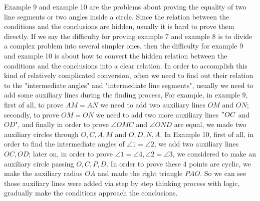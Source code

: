 \documentclass[12pt]{article}
\begin{document}
Example 9 and example 10 are the problems about proving the equality of two line segments or two angles inside a circle. Since the relation between the conditions and the conclusions are hidden,
usually it is hard to prove them directly. If we say the difficulty for proving example 7 and example 8 is to divide a complex problem into several simpler ones, then the difficulty for example 9 and
example 10 is about how to convert the hidden relation between the conditions and the conclusions into a clear relation.
In order to accomplish this kind of relatively complicated conversion, often we need to find out their relation to the "intermediate angles" and "intermediate line segments", usually we need to add some
auxiliary lines  during the finding process, 
For example, in example 9, first of all,  to prove $AM=AN$ we need to add two auxiliary lines $OM$ and $ ON$; secondly, to prove $OM=ON$ we need to add two more auxiliary lines $"OC$ and $OD$",
and finally in order to prove $\angle OMC$ and $\angle OND$ are equal, we made two auxiliary circles through $O, C, A, M$ and $O, D, N, A$.
In Example 10, first of all,  in order to find the intermediate angles of $\angle 1=\angle 2$, we add two auxiliary lines $OC, OD$; later on, in order to prove $\angle 1=\angle 4, \angle 2=\angle 3$, we considered to make
an auxiliary circle passing $O, C, P, D$. In order to prove these 4 points are cyclic, we make the auxiliary  radius $OA$ and made the right triangle $PAO$.
So we can see those auxiliary lines were added  via step by step thinking process with logic, gradually make the conditions approach the conclusions.
\end{document}
